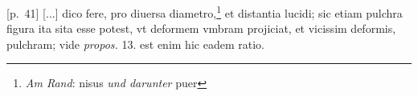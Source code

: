 [p.~41] [...] dico fere, pro  diuersa diametro,\footnote{\textit{Am Rand}: nisus \textit{und darunter} puer} et distantia lucidi; sic etiam pulchra figura ita sita esse potest, vt deformem vmbram projiciat,  et vicissim deformis, pulchram; vide \textit{propos.} 13. est enim  hic eadem ratio.